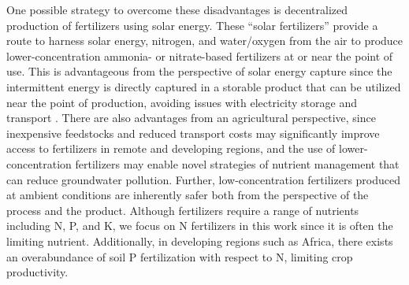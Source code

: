 One possible strategy to overcome these disadvantages is decentralized production of fertilizers using solar energy. These ``solar fertilizers'' provide a route to harness solar energy, nitrogen, and water/oxygen from the air to produce lower-concentration ammonia- or nitrate-based fertilizers at or near the point of use. This is advantageous from the perspective of solar energy capture since the intermittent energy is directly captured in a storable product that can be utilized near the point of production, avoiding issues with electricity storage and transport \cite{MacKay_2013}. There are also advantages from an agricultural perspective, since inexpensive feedstocks and reduced transport costs may significantly improve access to fertilizers in remote and developing regions, and the use of lower-concentration fertilizers may enable novel strategies of nutrient management that can reduce groundwater pollution. Further, low-concentration fertilizers produced at ambient conditions are inherently safer both from the perspective of the process and the product. Although fertilizers require a range of nutrients including N, P, and K, we focus on N fertilizers in this work since it is often the limiting nutrient\cite{Yousaf2017}. Additionally, in developing regions such as Africa, there exists an overabundance of soil P fertilization with respect to N\cite{VanderVelde2014}, limiting crop productivity. %

